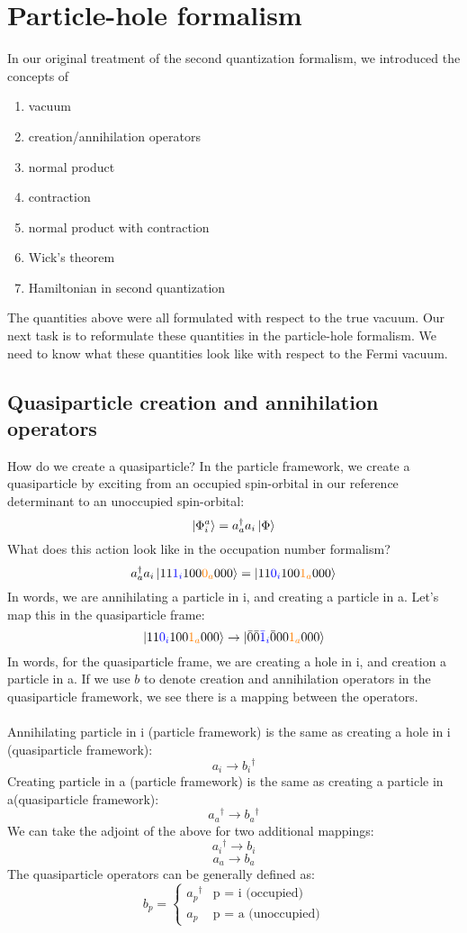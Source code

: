 \documentclass{article}
\newcommand{\kphi}{\ensuremath{\ket{\Phi}} }
\newcommand{\dg}{\ensuremath{^\dagger} }
\def\cb#1{{\color{blue}#1}}
\def\co#1{{\color{orange}#1}}
\begin{document}
\section{Particle-hole formalism} 
In our original treatment of the second quantization formalism, we introduced the concepts of 
\begin{enumerate}
\item vacuum
\item creation/annihilation operators
\item normal product
\item	contraction
\item	normal product with contraction 
\item Wick's theorem
\item Hamiltonian in second quantization
\end{enumerate}
The quantities above were all formulated with respect to the true vacuum.
Our next task is to reformulate these quantities in the particle-hole formalism.
We need to know what these quantities look like with respect to the Fermi vacuum. 

\subsection{Quasiparticle creation and annihilation operators}
How do we create a quasiparticle? 
In the particle framework, we create a quasiparticle by exciting from an occupied spin-orbital in our reference determinant
to an unoccupied spin-orbital: 
\[\ket{\Phi_i^a} = a_a\dg a_i \kphi \]
What does this action look like in the occupation number formalism?
\[a_a\dg a_i \ket{11\cb{1_i}100\co{0_a}000} = \ket{11\cb{0_i}100\co{1_a}000}\]
In words, we are annihilating a particle in i, and creating a particle in a. 
Let's map this in the quasiparticle frame: 
\[\ket{11\cb{0_i}100\co{1_a}000} \rightarrow  \ket{\bar{0}\bar{0}\cb{\bar{1}_i}\bar{0}00\co{1_a}000} \]
In words, for the quasiparticle frame, we are creating a hole in i, and creation a particle in a. 
If we use $b$ to denote creation and annihilation operators in the quasiparticle framework, 
we see there is a mapping between the operators.
\\ \\
Annihilating particle in i (particle framework) is the same as creating a hole in i (quasiparticle framework): 
\[a_i \rightarrow b_i\dg\]
Creating particle in a (particle framework) is the same as creating a particle in a(quasiparticle framework): 
\[a_a\dg \rightarrow b_a\dg\]
We can take the adjoint of the above for two additional mappings:
\[a_i\dg \rightarrow b_i\]
\[a_a \rightarrow b_a\]
The quasiparticle operators can be generally defined as: 
\[
  b_p =
    \begin{cases}
      a_p\dg & \text{p = i (occupied)}\\
      a_p & \text{p = a (unoccupied)}
    \end{cases}       
\]
\end{document}
